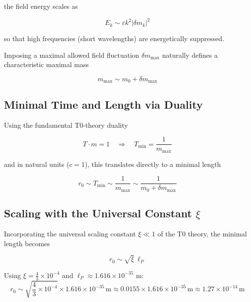 \documentclass[12pt,a4paper]{article}
\numberwithin{equation}{section}
\begin{document}
	the field energy scales as
	
	\begin{equation}
		E_k \sim \varepsilon k^2 |\delta m_k|^2
	\end{equation}
	
	so that high frequencies (short wavelengths) are energetically suppressed.  
	
	Imposing a maximal allowed field fluctuation $\delta m_{\mathrm{max}}$ naturally defines a characteristic maximal mass
	
	\begin{equation}
		m_{\mathrm{max}} \sim m_0 + \delta m_{\mathrm{max}}
	\end{equation}
	
	\subsection{Minimal Time and Length via Duality}
	
	Using the fundamental T0-theory duality
	
	\begin{equation}
		T \cdot m = 1 \quad \Rightarrow \quad T_{\mathrm{min}} = \frac{1}{m_{\mathrm{max}}}
	\end{equation}
	
	and in natural units ($c = 1$), this translates directly to a minimal length
	
	\begin{equation}
		r_0 \sim T_{\mathrm{min}} \sim \frac{1}{m_{\mathrm{max}}} \sim \frac{1}{m_0 + \delta m_{\mathrm{max}}}
	\end{equation}
	
	\subsection{Scaling with the Universal Constant $\xi$}
	
	Incorporating the universal scaling constant $\xi \ll 1$ of the T0 theory, the minimal length becomes
	
	\begin{equation}
		r_0 \sim \sqrt{\xi} \, \ell_P
	\end{equation}
	
	Using $\xi = \frac{4}{3} \times 10^{-4}$ and $\ell_P \approx 1.616 \times 10^{-35}$ m:
	\[
	r_0 \sim \sqrt{\frac{4}{3} \times 10^{-4}} \times 1.616 \times 10^{-35}\,\text{m} \approx 0.0155 \times 1.616 \times 10^{-35}\,\text{m} \approx 1.27 \times 10^{-14}\,\text{m}
	\]
	
\end{document}
